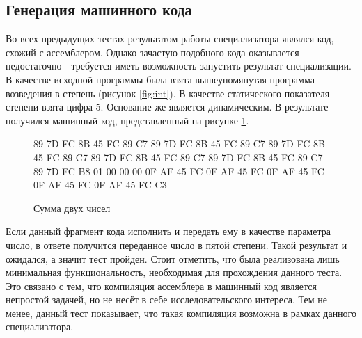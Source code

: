 \subsection{ Генерация машинного кода}

Во всех предыдущих тестах результатом работы специализатора являлся код, схожий с ассемблером. Однако зачастую подобного кода оказывается недостаточно - требуется иметь возможность запустить результат специализации. В качестве исходной программы была взята вышеупомянутая программа возведения в степень (рисунок \ref{fig:int}). В качестве статического показателя степени взята цифра $5$. Основание же является динамическим. В результате получился машинный код, представленный на рисунке \ref{fig:pow}.
\begin{figure}
89 7D FC 8B 45 FC 89 C7 89 7D FC 8B 45 FC 89 C7 89 7D FC 8B 45 FC 89 C7 89 7D FC 8B 45 FC 89 C7 89 7D FC 8B 45 FC 89 C7 89 7D FC B8 01 00 00 00 0F AF 45 FC 0F AF 45 FC 0F AF 45 FC 0F AF 45 FC 0F AF 45 FC C3
\caption{ Сумма двух чисел}
\label{fig:pow}
\end{figure}
Если данный фрагмент кода исполнить и передать ему в качестве параметра число, в ответе получится переданное число в пятой степени. Такой результат и ожидался, а значит тест пройден. Стоит отметить, что была реализована лишь минимальная функциональность, необходимая для прохождения данного теста. Это связано с тем, что компиляция ассемблера в машинный код является непростой задачей, но не несёт в себе исследовательского интереса. Тем не менее, данный тест показывает, что такая компиляция возможна в рамках данного специализатора.

